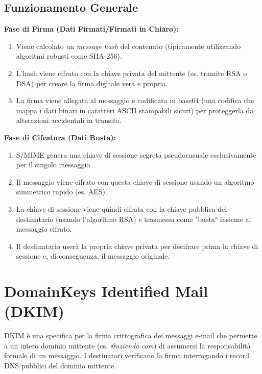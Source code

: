 \subsection{Funzionamento Generale}

\textbf{Fase di Firma (Dati Firmati/Firmati in Chiaro):}
\begin{enumerate}
    \item Viene calcolato un \textit{message hash} del contenuto (tipicamente utilizzando algoritmi robusti come SHA-256).
    \item L'hash viene cifrato con la chiave privata del mittente (es. tramite RSA o DSA) per creare la firma digitale vera e propria.
    \item La firma viene allegata al messaggio e codificata in base64 (una codifica che mappa i dati binari in caratteri ASCII stampabili sicuri) per proteggerla da alterazioni accidentali in transito.
\end{enumerate}

\textbf{Fase di Cifratura (Dati Busta):}
\begin{enumerate}
    \item S/MIME genera una chiave di sessione segreta pseudocasuale esclusivamente per il singolo messaggio.
    \item Il messaggio viene cifrato con questa chiave di sessione usando un algoritmo simmetrico rapido (es. AES).
    \item La chiave di sessione viene quindi cifrata con la chiave pubblica del destinatario (usando l'algoritmo RSA) e trasmessa come "busta" insieme al messaggio cifrato.
    \item Il destinatario userà la propria chiave privata per decifrare prima la chiave di sessione e, di conseguenza, il messaggio originale.
\end{enumerate}

\section{DomainKeys Identified Mail (DKIM)}

DKIM è una specifica per la firma crittografica dei messaggi e-mail che permette a un intero dominio mittente (es. \textit{@azienda.com}) di assumersi la responsabilità formale di un messaggio. I destinatari verificano la firma interrogando i record DNS pubblici del dominio mittente.

